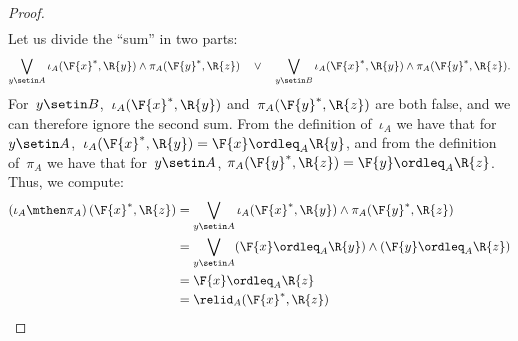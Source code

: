 \begin{proof}
\begin{equation}
\begin{aligned}
        \end{aligned}
    \end{equation}
    Let us divide the ``sum'' in two parts:
    \begin{equation}
        \bigvee_{y \setin A} \iota_A(\F{x}^*,\R{y}) \wedge \pi_A(\F{y}^*,\R{z}) \quad\vee\quad
        \bigvee_{y \setin B} \iota_A(\F{x}^*,\R{y}) \wedge \pi_A(\F{y}^*,\R{z}).
    \end{equation}
    For~$y \setin B$,~$\iota_A(\F{x}^*,\R{y})$ and~$\pi_A(\F{y}^*,\R{z})$ are both false, and we can therefore ignore the second sum.
    From the definition of~$\iota_A$ we have that for~$y\setin A$,~$ \iota_A(\F{x}^*,\R{y})=\F{x} \ordleq_A \R{y}$, and from the definition of~$\pi_A$ we have that for~$y\setin A$, $\pi_A(\F{y}^*,\R{z})=\F{y} \ordleq_A \R{z}$.
    Thus, we compute:
    \begin{equation}
        \begin{aligned}
            \left(\iota_A\mthen \pi_A\right)(\F{x}^*, \R{z}) & = \bigvee_{y \setin A} \iota_A(\F{x}^*,\R{y}) \wedge \pi_A(\F{y}^*,\R{z}) \\
                                                             & = \bigvee_{y \setin A} (\F{x} \ordleq_A \R{y}) \wedge  (\F{y} \ordleq_A \R{z}) \\
                                                             & = \F{x} \ordleq_A \R{z} \\
                                                             & = \relid_A(\F{x}^*, \R{z})
        \end{aligned}
    \end{equation}
\end{proof}

